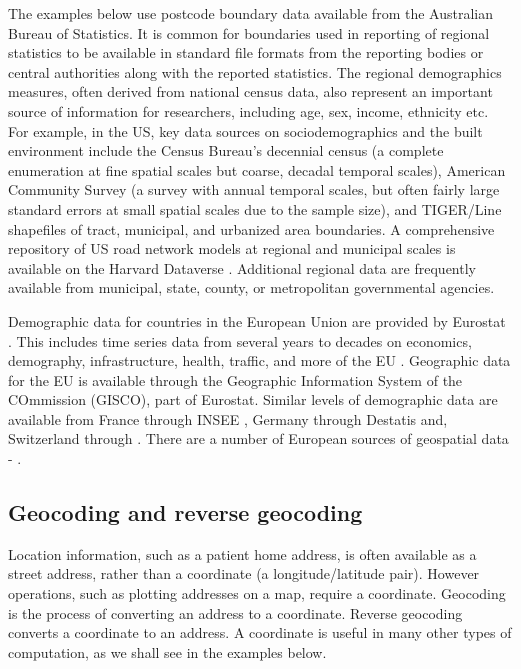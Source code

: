 \documentclass[utf8]{frontiersHLTH}
\begin{document}
The examples below use postcode boundary data available from the
Australian Bureau of Statistics. It is common for boundaries used in
reporting of regional statistics to be available in standard file
formats from the reporting bodies or central authorities along with
the reported statistics. The regional demographics measures, often
derived from national census data, also represent an important source
of information for researchers, including age, sex, income, ethnicity
etc.  For example, in the US, key data sources on sociodemographics
and the built environment include the Census Bureau's decennial census
\cite{us_census_bureau_decennial} (a complete enumeration at fine
spatial scales but coarse, decadal temporal scales), American
Community Survey\cite{us_census_bureau_acs} (a survey
with annual temporal scales, but often fairly large standard errors at
small spatial scales due to the sample size), and TIGER/Line
shapefiles\cite{us_census_tiger_line} of tract,
municipal, and urbanized area boundaries. A comprehensive repository 
of US road network models at regional and municipal scales is available
on the Harvard Dataverse \cite{boeing_street_2019}. Additional regional 
data are frequently available from municipal, state, county, or 
metropolitan governmental agencies.

Demographic data for countries in the European Union are provided by
Eurostat \cite{eurostat}. This includes time series data from several
years to decades on economics, demography, infrastructure, health,
traffic, and more of the EU \cite{Lahti2017}. Geographic data for the
EU is available through the Geographic Information System of the
COmmission (GISCO), part of Eurostat. Similar levels of demographic
data are available from France through INSEE \cite{insee}, Germany
through Destatis \cite{destatis} and, Switzerland through
\cite{swiss-bfs}. There are a number of European sources of geospatial
data - \cite{diva-gis,germany-gis,swiss-3d}.

\subsection{Geocoding and reverse
geocoding}\label{geocoding-and-reverse-geocoding}

Location information, such as a patient home address, is often available
as a street address, rather than a coordinate (a longitude/latitude
pair). However operations, such as plotting addresses on a map, require
a coordinate. Geocoding is the process of converting an address to a
coordinate. Reverse geocoding converts a coordinate to an address. A
coordinate is useful in many other types of computation, as we shall see
in the examples below.
\end{document}
